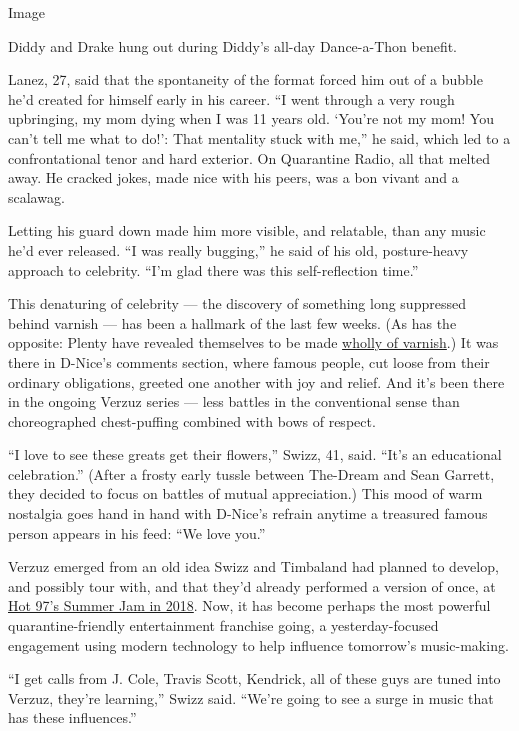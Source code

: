 Image

Diddy and Drake hung out during Diddy's all-day Dance-a-Thon benefit.

Lanez, 27, said that the spontaneity of the format forced him out of a
bubble he'd created for himself early in his career. ``I went through a
very rough upbringing, my mom dying when I was 11 years old. `You're not
my mom! You can't tell me what to do!': That mentality stuck with me,''
he said, which led to a confrontational tenor and hard exterior. On
Quarantine Radio, all that melted away. He cracked jokes, made nice with
his peers, was a bon vivant and a scalawag.

Letting his guard down made him more visible, and relatable, than any
music he'd ever released. ``I was really bugging,'' he said of his old,
posture-heavy approach to celebrity. ``I'm glad there was this
self-reflection time.''

This denaturing of celebrity --- the discovery of something long
suppressed behind varnish --- has been a hallmark of the last few weeks.
(As has the opposite: Plenty have revealed themselves to be made
\href{https://www.nytimes3xbfgragh.onion/2020/03/20/arts/music/coronavirus-gal-gadot-imagine.html}{wholly
of varnish}.) It was there in D-Nice's comments section, where famous
people, cut loose from their ordinary obligations, greeted one another
with joy and relief. And it's been there in the ongoing Verzuz series
--- less battles in the conventional sense than choreographed
chest-puffing combined with bows of respect.

``I love to see these greats get their flowers,'' Swizz, 41, said.
``It's an educational celebration.'' (After a frosty early tussle
between The-Dream and Sean Garrett, they decided to focus on battles of
mutual appreciation.) This mood of warm nostalgia goes hand in hand with
D-Nice's refrain anytime a treasured famous person appears in his feed:
``We love you.''

Verzuz emerged from an old idea Swizz and Timbaland had planned to
develop, and possibly tour with, and that they'd already performed a
version of once, at
\href{https://www.youtube.com/watch?v=kmpZU9iI6lE}{Hot 97's Summer Jam
in 2018}. Now, it has become perhaps the most powerful
quarantine-friendly entertainment franchise going, a yesterday-focused
engagement using modern technology to help influence tomorrow's
music-making.

``I get calls from J. Cole, Travis Scott, Kendrick, all of these guys
are tuned into Verzuz, they're learning,'' Swizz said. ``We're going to
see a surge in music that has these influences.''

